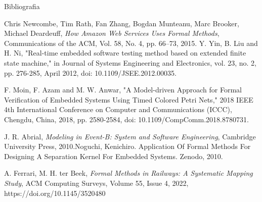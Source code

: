 \documentclass{purdue-poster}
\begin{document}
\begin{frame}{}
\begin{columns}[T]
\begin{column}{.48\linewidth}
\begin{block}{\large Bibliografia}
{\begin{thebibliography}{00}
            Chris Newcombe, Tim Rath, Fan Zhang, Bogdan Munteanu, Marc Brooker, Michael Deardeuff, \emph{How Amazon Web Services Uses Formal Methods}, Communications of the ACM, Vol. 58, No. 4, pp. 66--73, 2015.
            Y. Yin, B. Liu and H. Ni, "Real-time embedded software testing method based on extended finite state machine," in Journal of Systems Engineering and Electronics, vol. 23, no. 2, pp. 276-285, April 2012, doi: 10.1109/JSEE.2012.00035.
            
            F. Moin, F. Azam and M. W. Anwar, "A Model-driven Approach for Formal Verification of Embedded Systems Using Timed Colored Petri Nets," 2018 IEEE 4th International Conference on Computer and Communications (ICCC), Chengdu, China, 2018, pp. 2580-2584, doi: 10.1109/CompComm.2018.8780731.

            J. R. Abrial, \emph{Modeling in Event-B: System and Software Engineering}, Cambridge University Press, 2010.Noguchi, Kenichiro. Application Of Formal Methods For Designing A Separation Kernel For Embedded Systems. Zenodo, 2010.
        
            A. Ferrari, M. H. ter Beek, \emph{Formal Methods in Railways: A Systematic Mapping Study}, ACM Computing Surveys, Volume 55, Issue 4, 2022, https://doi.org/10.1145/3520480
        \end{thebibliography}
        }
    \end{block}
    \end{column}
    \end{columns}
    \vfill
\end{frame}
\end{document}
